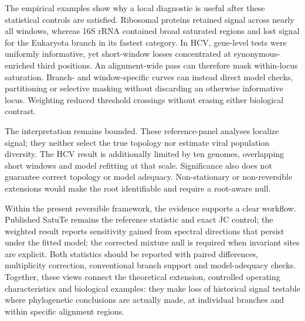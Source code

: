 The empirical examples show why a local diagnostic is useful after these statistical controls are satisfied. Ribosomal proteins retained signal across nearly all windows, whereas 16S rRNA contained broad saturated regions and lost signal for the Eukaryota branch in its fastest category. In HCV, gene-level tests were uniformly informative, yet short-window losses concentrated at synonymous-enriched third positions. An alignment-wide pass can therefore mask within-locus saturation. Branch- and window-specific curves can instead direct model checks, partitioning or selective masking without discarding an otherwise informative locus. Weighting reduced threshold crossings without erasing either biological contrast.

The interpretation remains bounded. These reference-panel analyses localize signal; they neither select the true topology nor estimate viral population diversity. The HCV result is additionally limited by ten genomes, overlapping short windows and model refitting at that scale. Significance also does not guarantee correct topology or model adequacy. Non-stationary or non-reversible extensions would make the root identifiable and require a root-aware null.

Within the present reversible framework, the evidence supports a clear workflow. Published SatuTe remains the reference statistic and exact JC control; the weighted result reports sensitivity gained from spectral directions that persist under the fitted model; the corrected mixture null is required when invariant sites are explicit. Both statistics should be reported with paired differences, multiplicity correction, conventional branch support and model-adequacy checks. Together, these views connect the theoretical extension, controlled operating characteristics and biological examples: they make loss of historical signal testable where phylogenetic conclusions are actually made, at individual branches and within specific alignment regions.
